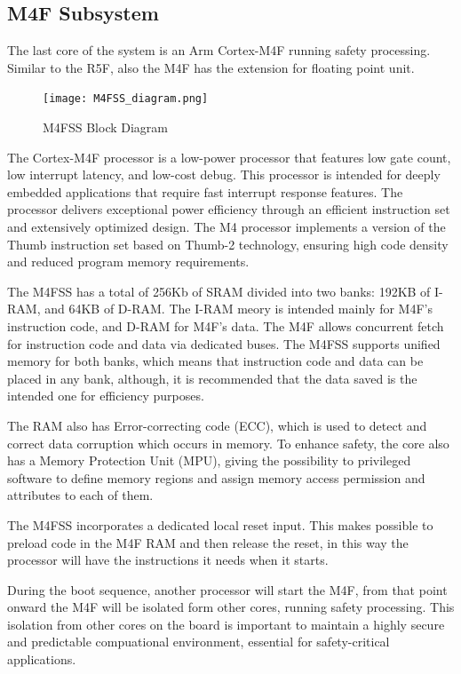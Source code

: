 \subsection{M4F Subsystem}

The last core of the system is an Arm Cortex-M4F running safety processing.
Similar to the R5F, also the M4F has the extension for floating point unit.

\begin{figure}[H]
    \centering
    \texttt{[image: M4FSS\_diagram.png]}
    \caption{M4FSS Block Diagram}
\end{figure}

The Cortex-M4F processor is a low-power processor that features low gate count,
low interrupt latency, and low-cost debug. This processor is intended for
deeply embedded applications that require fast interrupt response features.
\cite{M4F_technical_reference}
The processor delivers exceptional power efficiency through an efficient
instruction set and extensively optimized design. The M4 processor implements
a version of the Thumb instruction set based on Thumb-2 technology, ensuring
high code density and reduced program memory requirements.

The M4FSS has a total of 256Kb of SRAM divided into two banks: 192KB of I-RAM,
and 64KB of D-RAM. The I-RAM meory is intended mainly for M4F's instruction
code, and D-RAM for M4F's data. The M4F allows concurrent fetch for instruction
code and data via dedicated buses.
The M4FSS supports unified memory for both banks, which means that instruction
code and data can be placed in any bank, although, it is recommended that
the data saved is the intended one for efficiency purposes.

The RAM also has Error-correcting code (ECC), which is used to detect and
correct data corruption which occurs in memory.
To enhance safety, the core also has a Memory Protection Unit (MPU), giving
the possibility to privileged software to define memory regions and assign
memory access permission and attributes to each of them.

The M4FSS incorporates a dedicated local reset input. This makes possible to
preload code in the M4F RAM and then release the reset, in this way the
processor will have the instructions it needs when it starts.

During the boot sequence, another processor will start the M4F, from that point
onward the M4F will be isolated form other cores, running safety processing.
This isolation from other cores on the board is important to maintain a highly
secure and predictable compuational environment, essential for safety-critical
applications.

